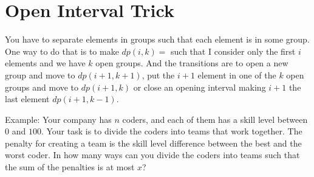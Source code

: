 \section{Open Interval Trick}

You have to separate elements in groups such that each element is in some group. One way to do that is to make $dp(i,k) = $ such that I consider only the first $i$ elements and we have $k$ open groups. And the transitions are to open a new group and move to $dp(i+1,k+1)$, put the $i+1$ element in one of the $k$ open groups and move to $dp(i+1,k)$ or close an opening interval making $i+1$ the last element $dp(i+1,k-1)$.

Example: Your company has $n$ coders, and each of them has a skill level between $0$ and $100$. Your task is to divide the coders into teams that work together. The penalty for creating a team is the skill level difference between the best and the worst coder. In how many ways can you divide the coders into teams such that the sum of the penalties is at most $x$?
